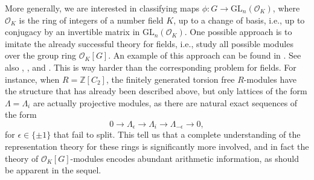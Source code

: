 \documentclass{article}
\theoremstyle{definition}
\theoremstyle{remark}
\begin{document}
More generally, we are interested in classifying maps 
$\phi:G\rightarrow\mathrm{GL}_n(\mathcal{O}_K)$,
where $\mathcal{O}_K$ is the ring of integers of a number
field $K$, up to a change of basis, 
i.e., up to conjugacy by an invertible matrix in 
$\mathrm{GL}_n(\mathcal{O}_K)$. One possible approach is to imitate
the already successful theory for fields, i.e., study all possible 
modules over the group ring $\mathcal{O}_K[G]$. An example of this 
approach can be found in \cite{Le64}. See also \cite{HR62a},
\cite{HR62b}, \cite{Jo62} and \cite{Ka98}. This is way harder than
the corresponding problem for fields. For instance, when
$R=\mathbb{Z}[C_2]$, the finitely generated
torsion free $R$-modules have the structure
that has already been described above, but only lattices of the form
$\Lambda=\Lambda_i$ are actually projective modules, as there are 
natural exact sequences of the form
$$0\rightarrow \Lambda_\epsilon\rightarrow \Lambda_i
\rightarrow\Lambda_{-\epsilon}\rightarrow0,$$
for $\epsilon\in\{\pm1\}$ that fail to split. This tell us that a
complete understanding of the representation theory for these rings
is significantly more involved, and in fact the theory
of $\mathcal{O}_K[G]$-modules encodes
abundant arithmetic information, as should be apparent in the
sequel.
\end{document}
